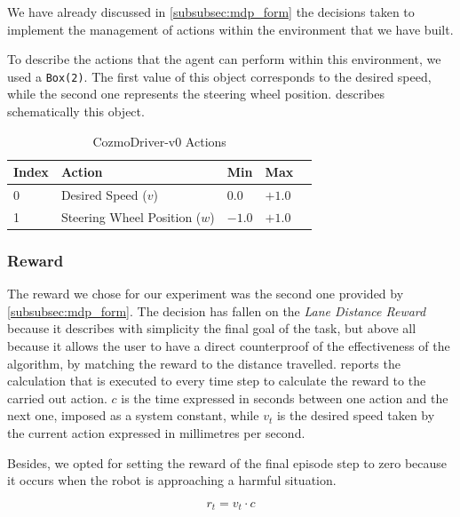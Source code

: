 We have already discussed in \vref{subsubsec:mdp_form} the decisions taken to implement the management of actions within the environment that we have built.

To describe the actions that the agent can perform within this environment, we used a \texttt{Box(2)}.
The first value of this object corresponds to the desired speed, while the second one represents the steering wheel position.
 describes schematically this object.

\begin{table}[!h]
	\centering
	\caption{CozmoDriver-v0 Actions}
	\label{table:cozmo_actions}
	\begin{tabular}{@{}lllll@{}}
		\toprule
		Index & Action                        & Min    & Max    \\ \midrule
		0     & Desired Speed ($v$)           & $0.0$  & $+1.0$ \\
		1     & Steering Wheel Position ($w$) & $-1.0$ & $+1.0$ \\

		\bottomrule
	\end{tabular}
\end{table}

\subsubsection{Reward}

The reward we chose for our experiment was the second one provided by \vref{subsubsec:mdp_form}.
The decision has fallen on the \textit{Lane Distance Reward} because it describes with simplicity the final goal of the task, but above all because it allows the user to have a direct counterproof of the effectiveness of the algorithm, by matching the reward to the distance travelled.
 reports the calculation that is executed to every time step to calculate the reward to the carried out action.
$c$ is the time expressed in seconds between one action and the next one, imposed as a system constant, while $v_t$ is the desired speed taken by the current action expressed in millimetres per second.

Besides, we opted for setting the reward of the final episode step to zero because it occurs when the robot is approaching a harmful situation.

\begin{equation}
	\label{eq:reward_fun}
	r_t = v_t \cdot c
\end{equation}

